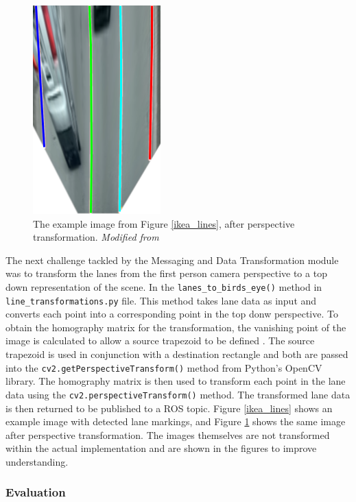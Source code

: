 \documentclass[titlepage,draft]{article}
\begin{document}
{\begin{figure}
	\centering
	\includegraphics[height=0.6\textwidth]{top_down_ikea.png}
	\caption{The example image from Figure \ref{ikea_lines}, after perspective transformation.  \textit{Modified from} \cite{ikea_image}}
	\label{transformed_ikea}
\end{figure}

The next challenge tackled by the Messaging and Data Transformation module was to transform the lanes from the first person camera perspective to a top down representation of the scene. In the \texttt{lanes\_to\_birds\_eye()} method in \texttt{line\_transformations.py} file. This method takes lane data as input and converts each point into a corresponding point in the top donw perspective. To obtain the homography matrix for the transformation, the vanishing point of the image is calculated to allow a source trapezoid to be defined \cite{johncmitchell}. The source trapezoid is used in conjunction with a destination rectangle and both are passed into the \texttt{cv2.getPerspectiveTransform()} method from Python's OpenCV library. The homography matrix is then used to transform each point in the lane data using the \texttt{cv2.perspectiveTransform()} method. The transformed lane data is then returned to be published to a ROS topic. Figure \ref{ikea_lines} shows an example image with detected lane markings, and Figure \ref{transformed_ikea} shows the same image after perspective transformation. The images themselves are not transformed within the actual implementation and are shown in the figures to improve understanding. 


\subsubsection{Evaluation}

}
\end{document}
